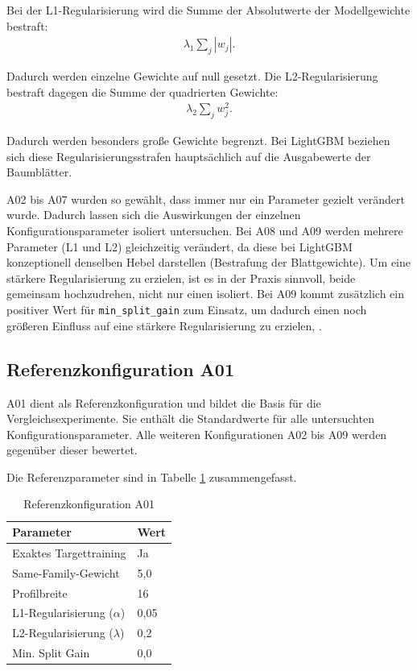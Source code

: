 Bei der L1-Regularisierung wird die Summe der Absolutwerte der Modellgewichte bestraft:
\begin{align}
  \lambda_1 \sum_j |w_j|.
\end{align}

Dadurch werden einzelne Gewichte auf null gesetzt. 
Die L2-Regularisierung bestraft dagegen die Summe der quadrierten Gewichte:
\begin{align}
  \lambda_2 \sum_j w_j^2.
\end{align}

Dadurch werden besonders große Gewichte begrenzt. Bei LightGBM beziehen sich diese Regularisierungsstrafen hauptsächlich auf die Ausgabewerte der Baumblätter.

A02 bis A07 wurden so gewählt, dass immer nur ein Parameter gezielt verändert wurde. Dadurch lassen sich die Auswirkungen der einzelnen Konfigurationsparameter isoliert untersuchen.
Bei A08 und A09 werden mehrere Parameter (L1 und L2) gleichzeitig verändert, da diese bei LightGBM konzeptionell denselben Hebel darstellen (Bestrafung der Blattgewichte). 
Um eine stärkere Regularisierung zu erzielen, ist es in der Praxis sinnvoll, beide gemeinsam hochzudrehen, nicht nur einen isoliert.
Bei A09 kommt zusätzlich ein positiver Wert für \texttt{min\_split\_gain} zum Einsatz, um dadurch einen noch größeren Einfluss auf eine stärkere Regularisierung zu erzielen, \parencite{LTR_Configuration_Test_Series}.


\subsection{Referenzkonfiguration A01}

A01 dient als Referenzkonfiguration und bildet die Basis für die Vergleichsexperimente. Sie enthält die Standardwerte für alle untersuchten Konfigurationsparameter.
Alle weiteren Konfigurationen A02 bis A09 werden gegenüber dieser bewertet.

Die Referenzparameter sind in Tabelle \ref{tab:a01_referenz} zusammengefasst.

\begin{table}[H] 
    \centering 
    \caption{Referenzkonfiguration A01} 
    \label{tab:a01_referenz} 
    \begin{tabular}{ll} 
        \toprule 
        \textbf{Parameter} & \textbf{Wert} \\ 
        \midrule 
        Exaktes Targettraining & Ja \\ 
        Same-Family-Gewicht & 5,0 \\ 
        Profilbreite & 16 \\ 
        L1-Regularisierung ($\alpha$) & 0,05 \\ 
        L2-Regularisierung ($\lambda$) & 0,2 \\ 
        Min. Split Gain & 0,0 \\ 
        \bottomrule 
    \end{tabular} 
\end{table}

